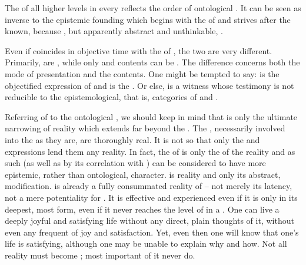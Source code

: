 \pa
The  of all higher levels in every  reflects
the order of ontological . It can be seen as inverse to the
epistemic founding which begins with the  of
 and strives after the known, because , but
apparently abstract and unthinkable, .

Even if  coincides in objective time with the  of
, the two are very different. Primarily,  are
, while only  and  contents can be
. The difference concerns both the mode of presentation and the
contents. One might be tempted to say:  is the {objectified
  expression} of  and  is the 
.  Or else,  is a witness whose testimony is not
reducible to the epistemological, that is,  categories of
 and .

Referring  of  to the ontological ,
we should keep in mind that  is only the ultimate narrowing of
reality which extends far beyond the \hoa.  The ,
necessarily involved into the  as they are, are thoroughly real.
It is not so that only the  and expressions lend them any
reality. In fact, the  of  is only the  of
the  reality and as such (as well as by its correlation with
) can be considered to have more epistemic, rather than
ontological, character.   is  reality and
 only its abstract,  modification.   is
already a fully consummated reality of  -- not merely its latency,
not a mere potentiality for .  It is effective and experienced
even if it is  only in its deepest, most  form, even if
it never reaches the level of  in a 
. One can live a deeply joyful and satisfying life without any direct,
plain thoughts of it, without even any frequent  of joy
and satisfaction. Yet, even then one will know that one's life is satisfying,
although one may be unable to explain  why and how. Not all
reality must become ; most important 
 of it never do.
  
